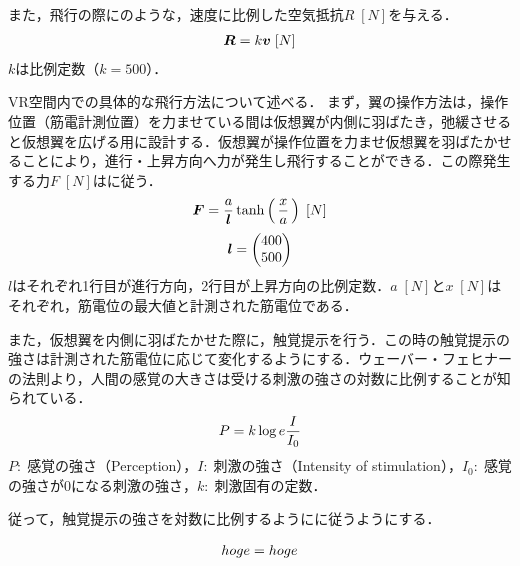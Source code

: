         また，飛行の際にのような，速度に比例した空気抵抗$R\;[N]$を与える．
        \begin{eqnarray}
                \equlabel{air_resistance}
                \bm{R}=k\bm{v} \;[N]
        \end{eqnarray}
        $k$は比例定数（$k=500$）．

        VR空間内での具体的な飛行方法について述べる．
        まず，翼の操作方法は，操作位置（筋電計測位置）を力ませている間は仮想翼が内側に羽ばたき，弛緩させると仮想翼を広げる用に設計する．仮想翼が操作位置を力ませ仮想翼を羽ばたかせることにより，進行・上昇方向へ力が発生し飛行することができる．この際発生する力$F\;[N]$はに従う．
        \begin{eqnarray}
                \equlabel{force}
                \bm{F}=\frac{a}{\bm{l}}  \tanh\left(\,\frac{x}{a}\,\right) \;[N]
        \end{eqnarray}
        \begin{eqnarray}
                \equlabel{force_prop}
                \bm{l}=\begin{pmatrix}400 \\ 500 \end{pmatrix}
        \end{eqnarray}
        $l$はそれぞれ1行目が進行方向，2行目が上昇方向の比例定数．$a\;[N]$と$x\;[N]$はそれぞれ，筋電位の最大値と計測された筋電位である．

        また，仮想翼を内側に羽ばたかせた際に，触覚提示を行う．この時の触覚提示の強さは計測された筋電位に応じて変化するようにする．ウェーバー・フェヒナーの法則\cite{10011340169}より，人間の感覚の大きさは受ける刺激の強さの対数に比例することが知られている．
        \begin{eqnarray}
                \equlabel{weber_fechner}
                P = k \log{e}\frac{I}{I_{0}}
        \end{eqnarray}
        $P:\;$感覚の強さ（Perception），$I:\;$刺激の強さ（Intensity of stimulation），$I_{0}:\;$感覚の強さが0になる刺激の強さ，$k:\;$刺激固有の定数．

        従って，触覚提示の強さを対数に比例するようにに従うようにする．
        
        \begin{eqnarray}
                \equlabel{haptics}
                hoge=hoge
        \end{eqnarray}
        

